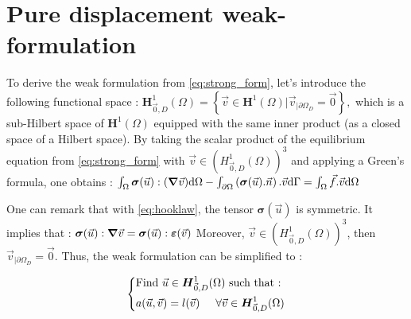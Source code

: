 \documentclass[a4paper,12pt,twoside]{report}
\newcommand{\dif}{\mathrm{d}}
\begin{document}
\section{Pure displacement weak-formulation} \label{sec:Pure displacement weak-formulation}

To derive the weak formulation from \eqref{eq:strong_form}, let's introduce the following functional space : $\boldsymbol H^1_{\vec 0,D}(\Omega) = \left\{ \vec v \in \boldsymbol H^1(\Omega) \Big| \vec v_{|\partial\Omega_D} = \vec 0 \right\},$
which is a sub-Hilbert space of $\boldsymbol H^1(\Omega)$ equipped with the same inner product (as a closed space of a Hilbert space). By taking the scalar product of the equilibrium equation from \eqref{eq:strong_form} with $\vec v \in \left(H^1_{\vec 0,D}(\Omega) \right)^3$ and applying a Green's formula, one obtains :
$\int_\Omega \boldsymbol{\sigma} (\vec u) : (\grad \vec v) \dif \Omega - \int_{\partial\Omega} \left(\boldsymbol{\sigma} (\vec u).\vec n \right).\vec v \dif \Gamma = \int_\Omega \vec f . \vec v \dif \Omega$

One can remark that with \eqref{eq:hooklaw}, the tensor $\boldsymbol \sigma (\vec u)$ is symmetric. It implies that : 
$\boldsymbol \sigma (\vec u) : \grad \vec v = \boldsymbol \sigma(\vec u) : \boldsymbol \varepsilon (\vec v)$
Moreover, $\vec v \in \left(H^1_{\vec 0,D}(\Omega) \right)^3$, then $\vec v_{|\partial\Omega_D} = \vec 0$. Thus, the weak formulation can be simplified to : 

\begin{tcolorbox}
\begin{equation}
\label{eq:weakdisplacementform}
\left\{
    \begin{aligned}
    &\text{Find } \vec u \in \boldsymbol H^1_{\vec 0,D}(\Omega) \text{ such that :}\\
    & a(\vec u,\vec v) = l(\vec v) \hspace{0.5cm} \forall \vec v \in \boldsymbol H^1_{\vec 0,D}(\Omega)
    \end{aligned}
\right.
\end{equation}
\end{tcolorbox}
\end{document}
